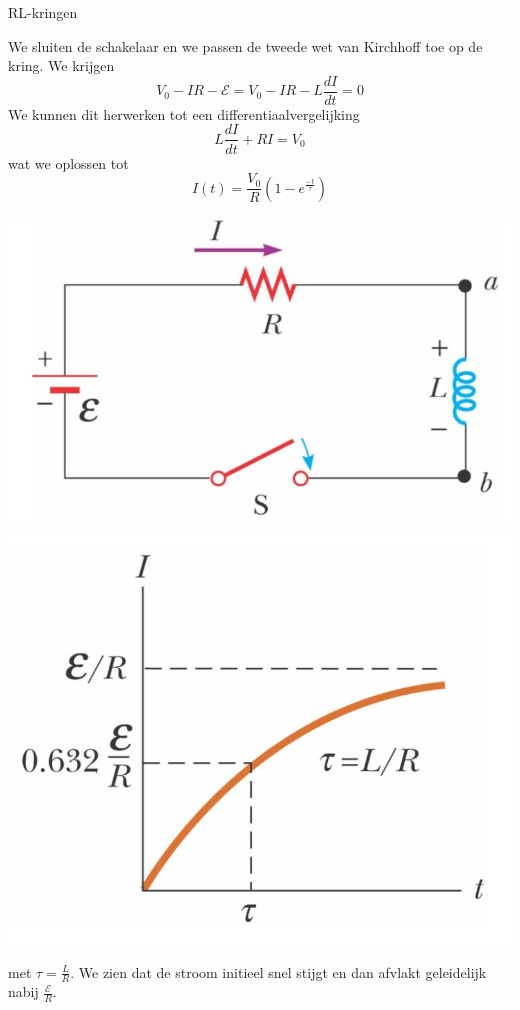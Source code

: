\begin{app}[RL-kringen]{RL-kringen}
    \vspace{-0.5cm}
    \begin{minipage}{.66\textwidth}
        We sluiten de schakelaar en we passen de tweede wet van Kirchhoff toe op de kring. We krijgen
        \begin{equation*}
            V_{0} - IR - \mathcal{E} = V_{0} - IR - L\dfrac{dI}{dt} = 0
        \end{equation*}
        We kunnen dit herwerken tot een differentiaalvergelijking
        \begin{equation*}
            L\dfrac{dI}{dt} + RI = V_{0}
        \end{equation*}
        wat we oplossen tot 
        \begin{equation*}
            I(t) = \dfrac{V_{0}}{R}\left(1 - e^{\tfrac{-t}{\tau}}\right)
        \end{equation*}
    \end{minipage}
    \begin{minipage}{.3\textwidth}
        \hspace{0.5cm}\includegraphics[scale = 0.35]{Images/Magnetisme/RLKring}
        \includegraphics[scale = 0.35]{Images/Magnetisme/RLKringGraph.png}
    \end{minipage}

    \noindent met $\tau = \tfrac{L}{R}$. We zien dat de stroom initieel snel stijgt en dan afvlakt geleidelijk nabij $\tfrac{\mathcal{E}}{R}$.
\end{app}
